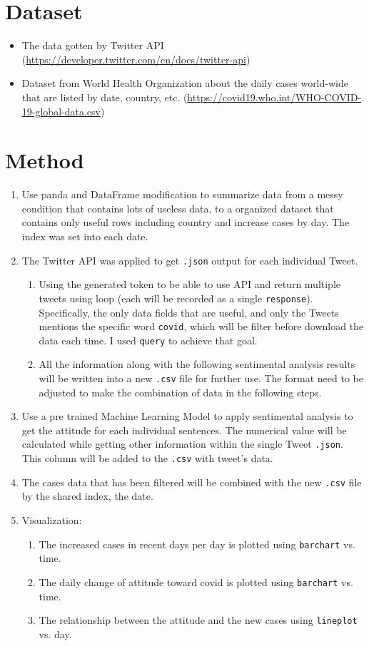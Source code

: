 \documentclass[a4paper, 12pt]{article}
\begin{document}
\section*{Dataset}
\begin{itemize}
    \item The data gotten by Twitter API (\url{https://developer.twitter.com/en/docs/twitter-api})
    \item Dataset from World Health Organization about the daily cases world-wide that are listed by date, country, etc. (\url{https://covid19.who.int/WHO-COVID-19-global-data.csv})
\end{itemize}

\section*{Method}
\begin{enumerate}
    \item Use panda and DataFrame modification to summarize data from a messy condition that contains lots of useless data, to a organized dataset that contains only useful rows including country and increase cases by day. The index was set into each date.
    \item The Twitter API was applied to get \texttt{.json} output for each individual Tweet.
    \begin{enumerate}
        \item Using the generated token to be able to use API and return multiple tweets using loop (each will be recorded as a single \texttt{response}). Specifically, the only data fields that are useful, and only the Tweets mentions the specific word \texttt{covid}, which will be filter before download the data each time. I used \texttt{query} to achieve that goal.
        \item All the information along with the following sentimental analysis results will be written into a new \texttt{.csv} file for further use. The format need to be adjusted to make the combination of data in the following steps.
    \end{enumerate}
    \item Use a pre trained Machine Learning Model to apply sentimental analysis to get the attitude for each individual sentences. The numerical value will be calculated while getting other information within the single Tweet \texttt{.json}. This column will be added to the \texttt{.csv} with tweet's data.
    \item The cases data that has been filtered will be combined with the new \texttt{.csv} file by the shared index, the date.
    \item Visualization:
    \begin{enumerate}
        \item The increased cases in recent days per day is plotted using \texttt{barchart} vs. time.
        \item The daily change of attitude toward covid is plotted using \texttt{barchart} vs. time.
        \item The relationship between the attitude and the new cases using \texttt{lineplot} vs. day.
    \end{enumerate}
\end{enumerate}
\end{document}
